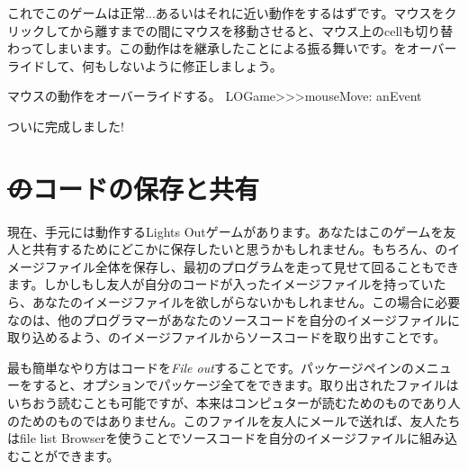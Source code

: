 \documentclass[a4paper,10pt,twoside]{book}
\begin{document}


これでこのゲームは正常...あるいはそれに近い動作をするはずです。マウスをクリックしてから離すまでの間にマウスを移動させると、マウス上のcellも切り替わってしまいます。この動作はを継承したことによる振る舞いです。をオーバーライドして、何もしないように修正しましょう。

\begin{method}[mouseMove:]{マウスの動作をオーバーライドする。}
LOGame>>>mouseMove: anEvent
\end{method}

ついに完成しました!


\section{\st のコードの保存と共有}

現在、手元には動作するLights Outゲームがあります。あなたはこのゲームを友人と共有するためにどこかに保存したいと思うかもしれません。もちろん、\pharo のイメージファイル全体を保存し、最初のプログラムを走って見せて回ることもできます。しかしもし友人が自分のコードが入ったイメージファイルを持っていたら、あなたのイメージファイルを欲しがらないかもしれません。この場合に必要なのは、他のプログラマーがあなたのソースコードを自分のイメージファイルに取り込めるよう、\pharo のイメージファイルからソースコードを取り出すことです。

最も簡単なやり方はコードを\emph{File out}することです。パッケージペインのメニューを\actclick すると、オプションでパッケージ全てをできます。取り出されたファイルはいちおう読むことも可能ですが、本来はコンピュターが読むためのものであり人のためのものではありません。このファイルを友人にメールで送れば、友人たちはfile list Browserを使うことでソースコードを自分の\pharo イメージファイルに組み込むことができます。
\end{document}
